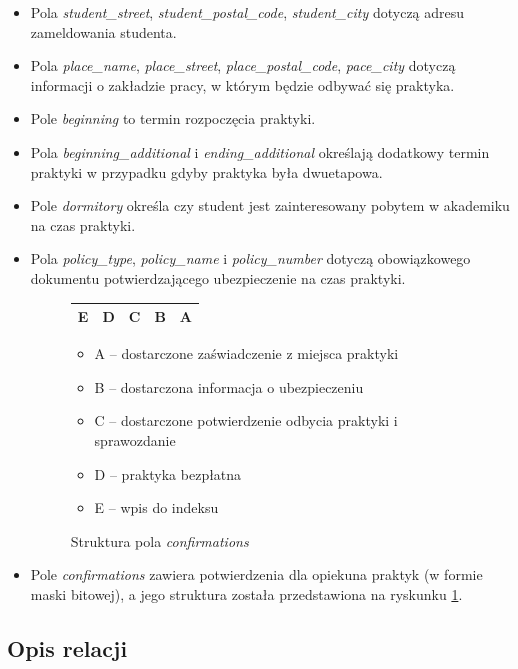 \documentclass[a4paper,12pt,oneside]{report}
\begin{document}
\begin{itemize}
  \item Pola \emph{student\_street}, \emph{student\_postal\_code}, \emph{student\_city} dotyczą adresu zameldowania studenta.
  \item Pola \emph{place\_name}, \emph{place\_street}, \emph{place\_postal\_code}, \emph{pace\_city} dotyczą informacji o zakładzie pracy, w którym będzie odbywać się praktyka.
  \item Pole \emph{beginning} to termin rozpoczęcia praktyki.
  \item Pola \emph{beginning\_additional} i \emph{ending\_additional} określają dodatkowy termin praktyki w przypadku gdyby praktyka była dwuetapowa.
  \item Pole \emph{dormitory} określa czy student jest zainteresowany pobytem w akademiku na czas praktyki.
  \item Pola \emph{policy\_type}, \emph{policy\_name} i \emph{policy\_number} dotyczą obowiązkowego dokumentu potwierdzającego ubezpieczenie na czas praktyki.

\begin{figure}[h]
  \centering
  \begin{tabular}{|c|c|c|c|c|}\hline
  E & D & C & B & A \\\hline
  \end{tabular}
  \begin{itemize}
    \item A -- dostarczone zaświadczenie z miejsca praktyki
    \item B -- dostarczona informacja o ubezpieczeniu
    \item C -- dostarczone potwierdzenie odbycia praktyki i sprawozdanie
    \item D -- praktyka bezpłatna
    \item E -- wpis do indeksu
  \end{itemize}
  \caption{Struktura pola \emph{confirmations}\label{fig:confirmations}}
\end{figure}

  \item Pole \emph{confirmations} zawiera potwierdzenia dla opiekuna praktyk (w formie maski bitowej), a jego struktura została przedstawiona na ryskunku \ref{fig:confirmations}.
\end{itemize}


\subsection{Opis relacji}
\label{sub:relacje}
\end{document}
